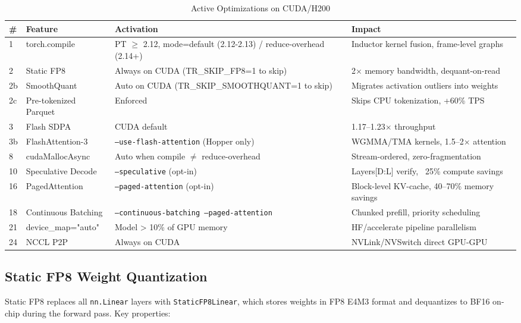 \documentclass[11pt,a4paper,twoside]{article}
\begin{document}
\begin{table}[H]
\centering
\caption{Active Optimizations on CUDA/H200}
\label{tab:optimizations}
\begin{tabular}{llp{3cm}p{4cm}}
\toprule
\textbf{\#} & \textbf{Feature} & \textbf{Activation} & \textbf{Impact} \\
\midrule
1  & torch.compile & PT $\geq$ 2.12, mode=default (2.12-2.13) / reduce-overhead (2.14+) & Inductor kernel fusion, frame-level graphs \\
2  & Static FP8 & Always on CUDA (TR\_SKIP\_FP8=1 to skip) & 2$\times$ memory bandwidth, dequant-on-read \\
2b & SmoothQuant & Auto on CUDA (TR\_SKIP\_SMOOTHQUANT=1 to skip) & Migrates activation outliers into weights \\
2c & Pre-tokenized Parquet & Enforced & Skips CPU tokenization, +60\% TPS \\
3  & Flash SDPA & CUDA default & 1.17--1.23$\times$ throughput \\
3b & FlashAttention-3 & \texttt{---use-flash-attention} (Hopper only) & WGMMA/TMA kernels, 1.5--2$\times$ attention \\
8  & cudaMallocAsync & Auto when compile $\neq$ reduce-overhead & Stream-ordered, zero-fragmentation \\
10 & Speculative Decode & \texttt{---speculative} (opt-in) & Layers[D:L] verify, ~25\% compute savings \\
16 & PagedAttention & \texttt{---paged-attention} (opt-in) & Block-level KV-cache, 40--70\% memory savings \\
18 & Continuous Batching & \texttt{---continuous-batching ---paged-attention} & Chunked prefill, priority scheduling \\
21 & device\_map="auto" & Model > 10\% of GPU memory & HF/accelerate pipeline parallelism \\
24 & NCCL P2P & Always on CUDA & NVLink/NVSwitch direct GPU-GPU \\
\bottomrule
\end{tabular}
\end{table}

\subsection{Static FP8 Weight Quantization}

Static FP8 replaces all \texttt{nn.Linear} layers with \texttt{StaticFP8Linear},
which stores weights in FP8 E4M3 format and dequantizes to BF16 on-chip during
the forward pass. Key properties:
\end{document}

